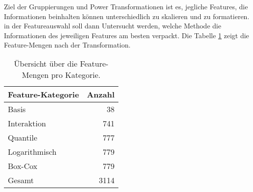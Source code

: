 Ziel der Gruppierungen und Power Transformationen ist es, jegliche Features, die Informationen beinhalten können unterschiedlich zu skalieren und zu formatieren. in der Featureauswahl soll dann Untersucht werden, welche Methode die Informationen des jeweiligen Features am besten verpackt. Die Tabelle \ref{tab:FeatureMenge} zeigt die Feature-Mengen nach der Transformation.


\begin{table}[ht]
    \centering
    \caption{Übersicht über die Feature-Mengen pro Kategorie.}
    \begin{tabular}{|l|r|}
        \hline
        Feature-Kategorie & Anzahl\\
        \hline
        Basis & 38 \\
        Interaktion & 741\\
        Quantile & 777\\
        Logarithmisch & 779\\
        Box-Cox & 779\\
        \hline
        \hline
        Gesamt & 3114\\
        \hline
    \end{tabular}
    \label{tab:FeatureMenge}
\end{table}